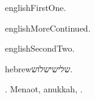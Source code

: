 \documentclass{article}
\begin{document}
\begin{mekor}\begin{mekorlang}{english}{First}One.\end{mekorlang}\end{mekor}
\begin{mekor*}\begin{mekorlang}{english}{More}Continued.\end{mekorlang}\end{mekor*}
\begin{mekor}\begin{mekorlang}{english}{Second}Two.\end{mekorlang}\end{mekor}
\begin{mekor}\begin{mekorlang}{hebrew}{שלישי}שלוש.\end{mekorlang}\end{mekor}
. Mena\hdot ot, \Hdot anukkah, .
\end{document}
